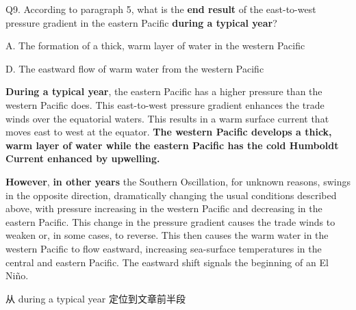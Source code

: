 \begin{blk}
    \begin{qst}
        Q9. According to paragraph 5, what is the \textbf{end result} of the east-to-west pressure gradient in the eastern Pacific \textbf{during a typical year}?
    \end{qst}

    \begin{chc}
        A. The formation of a thick, warm layer of water in the western Pacific

        D. The eastward flow of warm water from the western Pacific
    \end{chc}

    \begin{psgq}
        \textbf{During a typical year}, the eastern Pacific has a higher pressure than the western Pacific does. This east-to-west pressure gradient enhances the trade winds over the equatorial waters. This results in a warm surface current that moves east to west at the equator. \textbf{The western Pacific develops a thick, warm layer of water while the eastern Pacific has the cold Humboldt Current enhanced by upwelling.}

        \textbf{However}, \textbf{in other years} the Southern Oscillation, for unknown reasons, swings in the opposite direction, dramatically changing the usual conditions described above, with pressure increasing in the western Pacific and decreasing in the eastern Pacific. This change in the pressure gradient causes the trade winds to weaken or, in some cases, to reverse. This then causes the warm water in the western Pacific to flow eastward, increasing sea-surface temperatures in the central and eastern Pacific. The eastward shift signals the beginning of an El Niño.
    \end{psgq}

    \begin{nlz}
        从 during a typical year 定位到文章前半段
    \end{nlz}
\end{blk}

\newpage